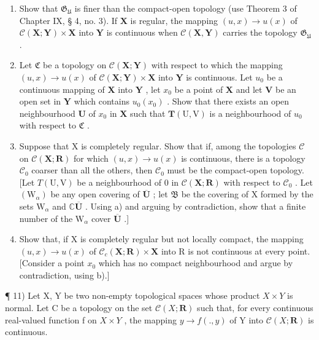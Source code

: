 \begin{enumerate}
\def\labelenumi{\alph{enumi})}
\item
  Show that \(\mathfrak{G}_{\mathfrak{U}}\) is finer than the compact-open topology (use Theorem 3 of Chapter IX, § 4, no. 3). If \(\mathbf{X}\) is regular, the mapping \((u, x) \to u(x)\) of \(\mathcal{C}(\mathbf{X}; \mathbf{Y}) \times \mathbf{X}\) into \(\mathbf{Y}\) is continuous when \(\mathcal{C}(\mathbf{X}, \mathbf{Y})\) carries the topology \(\mathfrak{G}_{\mathfrak{U}}\) .
\item
  Let \(\mathfrak{C}\) be a topology on \(\mathcal{C}(\mathbf{X};\mathbf{Y})\) with respect to which the mapping \((u,x)\to u(x)\) of \(\mathcal{C}(\mathbf{X};\mathbf{Y})\times \mathbf{X}\) into \(\mathbf{Y}\) is continuous. Let \(u_0\) be a continuous mapping of \(\mathbf{X}\) into \(\mathbf{Y}\) , let \(x_0\) be a point of \(\mathbf{X}\) and let \(\mathbf{V}\) be an open set in \(\mathbf{Y}\) which contains \(u_0(x_0)\) . Show that there exists an open neighbourhood \(\mathbf{U}\) of \(x_0\) in \(\mathbf{X}\) such that \(\pmb{T}(\mathrm{U},\mathrm{V})\) is a neighbourhood of \(u_0\) with respect to \(\mathfrak{C}\) .
\item
  Suppose that X is completely regular. Show that if, among the topologies \(\mathcal{C}\) on \(\mathcal{C}(\mathbf{X};\mathbf{R})\) for which \((u,x)\to u(x)\) is continuous, there is a topology \(\mathcal{C}_0\) coarser than all the others, then \(\mathcal{C}_0\) must be the compact-open topology. {[}Let \(T(\mathrm{U},\mathrm{V})\) be a neighbourhood of 0 in \(\mathcal{C}(\mathbf{X};\mathbf{R})\) with respect to \(\mathcal{C}_0\) . Let \((\mathrm{W}_{\alpha})\) be any open covering of \(\overline{\mathbf{U}}\) ; let \(\mathfrak{B}\) be the covering of X formed by the sets \(\mathrm{W}_{\alpha}\) and \(\mathbb{C}\overline{\mathbf{U}}\) . Using a) and arguing by contradiction, show that a finite number of the \(\mathrm{W}_{\alpha}\) cover \(\overline{\mathbf{U}}\) .{]}
\item
  Show that, if X is completely regular but not locally compact, the mapping \((u, x) \to u(x)\) of \(\mathcal{C}_{c}(\mathbf{X}; \mathbf{R}) \times \mathbf{X}\) into R is not continuous at every point. {[}Consider a point \(x_{0}\) which has no compact neighbourhood and argue by contradiction, using b).{]}
\end{enumerate}

¶ 11) Let X, Y be two non-empty topological spaces whose product \(X \times Y\) is normal. Let C be a topology on the set \(\mathcal{C}(X; \mathbf{R})\) such that, for every continuous real-valued function f on \(X \times Y\) , the mapping \(y \to f(., y)\) of Y into \(\mathcal{C}(X; \mathbf{R})\) is continuous.

